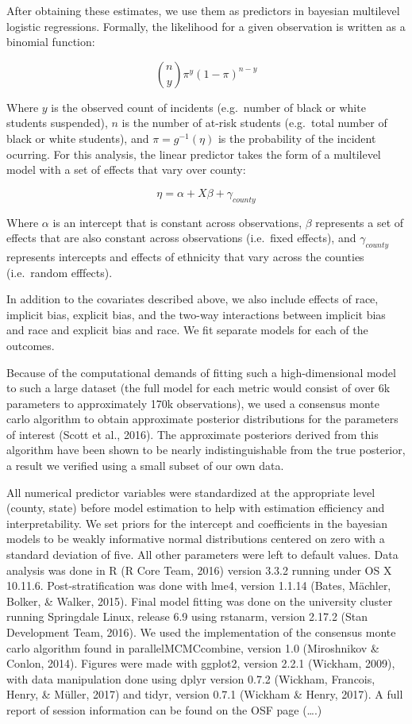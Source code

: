 \documentclass[english,floatsintext,man]{apa6}
\theoremstyle{definition}
\theoremstyle{definition}
\theoremstyle{remark}
\begin{document}
After obtaining these estimates, we use them as predictors in bayesian
multilevel logistic regressions. Formally, the likelihood for a given
observation is written as a binomial function:

\[
{n\choose y}\pi^y(1-\pi)^{n-y}
\]

Where \(y\) is the observed count of incidents (e.g.~number of black or
white students suspended), \(n\) is the number of at-risk students
(e.g.~total number of black or white students), and
\(\pi = g^{-1}(\eta)\) is the probability of the incident ocurring. For
this analysis, the linear predictor takes the form of a multilevel model
with a set of effects that vary over county:

\[
\eta = \alpha + X\beta + \gamma_{county}
\]

Where \(\alpha\) is an intercept that is constant across observations,
\(\beta\) represents a set of effects that are also constant across
observations (i.e.~fixed effects), and \(\gamma_{county}\) represents
intercepts and effects of ethnicity that vary across the counties
(i.e.~random efffects).

In addition to the covariates described above, we also include effects
of race, implicit bias, explicit bias, and the two-way interactions
between implicit bias and race and explicit bias and race. We fit
separate models for each of the outcomes.

Because of the computational demands of fitting such a high-dimensional
model to such a large dataset (the full model for each metric would
consist of over 6k parameters to approximately 170k observations), we
used a consensus monte carlo algorithm to obtain approximate posterior
distributions for the parameters of interest (Scott et al., 2016). The
approximate posteriors derived from this algorithm have been shown to be
nearly indistinguishable from the true posterior, a result we verified
using a small subset of our own data.

All numerical predictor variables were standardized at the appropriate
level (county, state) before model estimation to help with estimation
efficiency and interpretability. We set priors for the intercept and
coefficients in the bayesian models to be weakly informative normal
distributions centered on zero with a standard deviation of five. All
other parameters were left to default values. Data analysis was done in
R (R Core Team, 2016) version 3.3.2 running under OS X 10.11.6.
Post-stratification was done with lme4, version 1.1.14 (Bates, Mächler,
Bolker, \& Walker, 2015). Final model fitting was done on the university
cluster running Springdale Linux, release 6.9 using rstanarm, version
2.17.2 (Stan Development Team, 2016). We used the implementation of the
consensus monte carlo algorithm found in parallelMCMCcombine, version
1.0 (Miroshnikov \& Conlon, 2014). Figures were made with ggplot2,
version 2.2.1 (Wickham, 2009), with data manipulation done using dplyr
version 0.7.2 (Wickham, Francois, Henry, \& Müller, 2017) and tidyr,
version 0.7.1 (Wickham \& Henry, 2017). A full report of session
information can be found on the OSF page (\ldots{}.)
\end{document}
